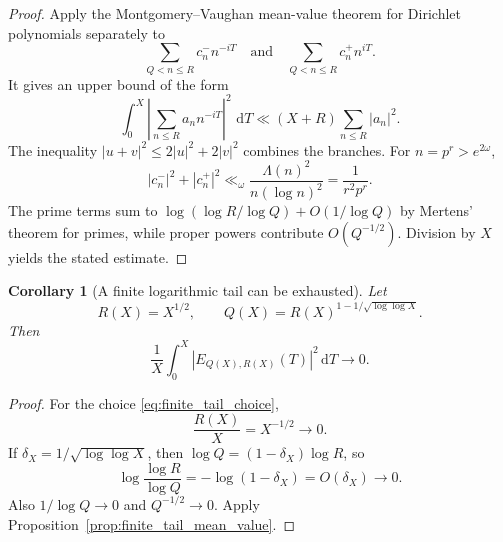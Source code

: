 \documentclass[11pt]{amsart}
\numberwithin{equation}{section}
\theoremstyle{plain}
\newtheorem{corollary}[theorem]{Corollary}
\theoremstyle{definition}
\theoremstyle{remark}
\newcommand{\1}{\mathbf{1}}
\newcommand{\dd}{\,\mathrm{d}}
\begin{document}
\begin{proof}
Apply the Montgomery--Vaughan mean-value theorem for Dirichlet polynomials
\cite[Chapter~7]{MontgomeryVaughan2007} separately to
\begin{equation}
\sum_{Q<n\leq R}c_n^-n^{-iT}
\quad\text{and}\quad
\sum_{Q<n\leq R}c_n^+n^{iT}.
\label{eq:MV_two_polynomials}
\end{equation}
It gives an upper bound of the form
\begin{equation}
\int_0^X\left|\sum_{n\leq R}a_nn^{-iT}\right|^2\,\dd T
\ll
(X+R)\sum_{n\leq R}|a_n|^2.
\label{eq:MV_mean_value_used}
\end{equation}
The inequality \(|u+v|^2\leq2|u|^2+2|v|^2\) combines the branches.  For
\(n=p^r>e^{2\omega}\),
\begin{equation}
|c_n^-|^2+|c_n^+|^2
\ll_\omega
\frac{\Lambda(n)^2}{n(\log n)^2}
=
\frac1{r^2p^r}.
\label{eq:finite_tail_coeff_square}
\end{equation}
The prime terms sum to
\(\log(\log R/\log Q)+O(1/\log Q)\) by Mertens' theorem for primes, while
proper powers contribute \(O(Q^{-1/2})\).  Division by \(X\) yields the
stated estimate.
\end{proof}

\begin{corollary}[A finite logarithmic tail can be exhausted]
\label{cor:finite_log_tail_exhaustion}
Let
\begin{equation}
R(X)=X^{1/2},
\qquad
Q(X)=R(X)^{1-1/\sqrt{\log\log X}}.
\label{eq:finite_tail_choice}
\end{equation}
Then
\begin{equation}
\frac1X\int_0^X|E_{Q(X),R(X)}(T)|^2\dd T
\longrightarrow0.
\label{eq:finite_tail_exhaustion}
\end{equation}
\end{corollary}

\begin{proof}
For the choice \eqref{eq:finite_tail_choice},
\begin{equation}
\frac{R(X)}{X}=X^{-1/2}\longrightarrow0.
\label{eq:finite_tail_RX}
\end{equation}
If \(\delta_X=1/\sqrt{\log\log X}\), then
\(\log Q=(1-\delta_X)\log R\), so
\begin{equation}
\log\frac{\log R}{\log Q}
=
-\log(1-\delta_X)
=
O(\delta_X)\longrightarrow0.
\label{eq:finite_tail_log_ratio}
\end{equation}
Also \(1/\log Q\to0\) and \(Q^{-1/2}\to0\).  Apply
Proposition~\ref{prop:finite_tail_mean_value}.
\end{proof}
\end{document}
